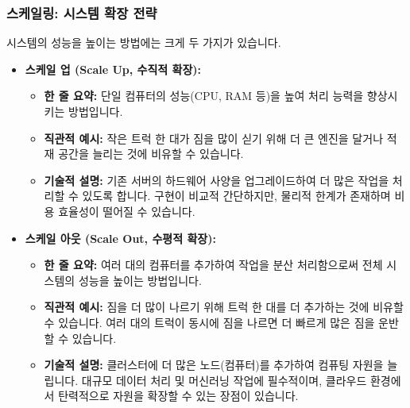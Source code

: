\documentclass[11pt,a4paper]{article}
\begin{document}
\subsubsection*{스케일링: 시스템 확장 전략}
시스템의 성능을 높이는 방법에는 크게 두 가지가 있습니다.
\begin{itemize}
    \item \textbf{스케일 업 (Scale Up, 수직적 확장):}
    \begin{itemize}
        \item \textbf{한 줄 요약:} 단일 컴퓨터의 성능(CPU, RAM 등)을 높여 처리 능력을 향상시키는 방법입니다.
        \item \textbf{직관적 예시:} 작은 트럭 한 대가 짐을 많이 싣기 위해 더 큰 엔진을 달거나 적재 공간을 늘리는 것에 비유할 수 있습니다.
        \item \textbf{기술적 설명:} 기존 서버의 하드웨어 사양을 업그레이드하여 더 많은 작업을 처리할 수 있도록 합니다. 구현이 비교적 간단하지만, 물리적 한계가 존재하며 비용 효율성이 떨어질 수 있습니다.
    \end{itemize}
    \item \textbf{스케일 아웃 (Scale Out, 수평적 확장):}
    \begin{itemize}
        \item \textbf{한 줄 요약:} 여러 대의 컴퓨터를 추가하여 작업을 분산 처리함으로써 전체 시스템의 성능을 높이는 방법입니다.
        \item \textbf{직관적 예시:} 짐을 더 많이 나르기 위해 트럭 한 대를 더 추가하는 것에 비유할 수 있습니다. 여러 대의 트럭이 동시에 짐을 나르면 더 빠르게 많은 짐을 운반할 수 있습니다.
        \item \textbf{기술적 설명:} 클러스터에 더 많은 노드(컴퓨터)를 추가하여 컴퓨팅 자원을 늘립니다. 대규모 데이터 처리 및 머신러닝 작업에 필수적이며, 클라우드 환경에서 탄력적으로 자원을 확장할 수 있는 장점이 있습니다.
    \end{itemize}
\end{itemize}
\end{document}
